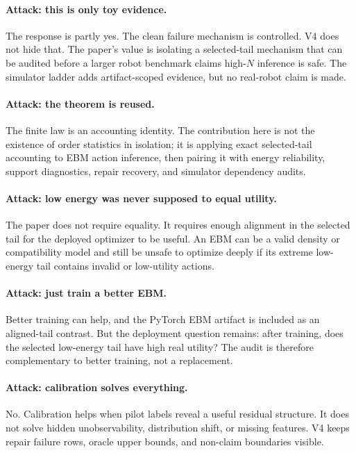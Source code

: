 \paragraph{Attack: this is only toy evidence.}
The response is partly yes. The clean failure mechanism is controlled. V4 does
not hide that. The paper's value is isolating a selected-tail mechanism that
can be audited before a larger robot benchmark claims high-\(N\) inference is
safe. The simulator ladder adds artifact-scoped evidence, but no real-robot
claim is made.

\paragraph{Attack: the theorem is reused.}
The finite law is an accounting identity. The contribution here is not the
existence of order statistics in isolation; it is applying exact selected-tail
accounting to EBM action inference, then pairing it with energy reliability,
support diagnostics, repair recovery, and simulator dependency audits.

\paragraph{Attack: low energy was never supposed to equal utility.}
The paper does not require equality. It requires enough alignment in the
selected tail for the deployed optimizer to be useful. An EBM can be a valid
density or compatibility model and still be unsafe to optimize deeply if its
extreme low-energy tail contains invalid or low-utility actions.

\paragraph{Attack: just train a better EBM.}
Better training can help, and the PyTorch EBM artifact is included as an
aligned-tail contrast. But the deployment question remains: after training,
does the selected low-energy tail have high real utility? The audit is
therefore complementary to better training, not a replacement.

\paragraph{Attack: calibration solves everything.}
No. Calibration helps when pilot labels reveal a useful residual structure.
It does not solve hidden unobservability, distribution shift, or missing
features. V4 keeps repair failure rows, oracle upper bounds, and non-claim
boundaries visible.

